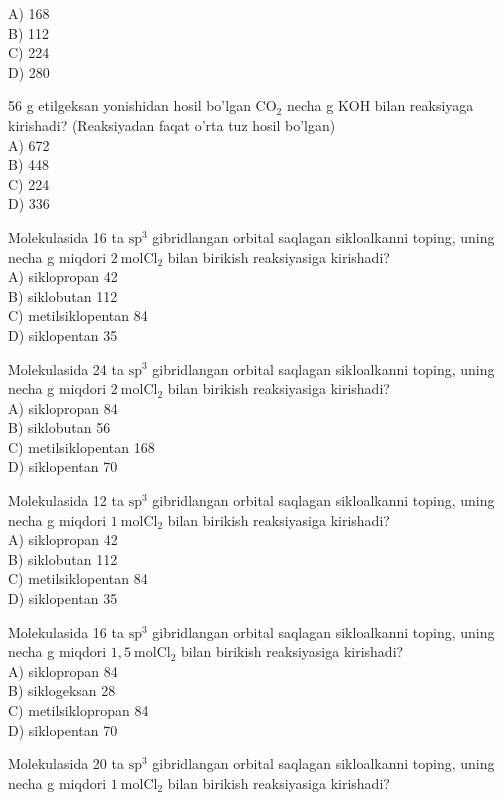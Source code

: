 A) 168\\
B) 112\\
C) 224\\
D) 280
  \item 56 g etilgeksan yonishidan hosil bo'lgan $\mathrm{CO}_{2}$ necha g KOH bilan reaksiyaga kirishadi? (Reaksiyadan faqat o'rta tuz hosil bo'lgan)\\
A) 672\\
B) 448\\
C) 224\\
D) 336
  \item Molekulasida 16 ta $\mathrm{sp}^{3}$ gibridlangan orbital saqlagan sikloalkanni toping, uning necha g miqdori $2 \mathrm{~mol} \mathrm{Cl}_{2}$ bilan birikish reaksiyasiga kirishadi?\\
A) siklopropan 42\\
B) siklobutan 112\\
C) metilsiklopentan 84\\
D) siklopentan 35
  \item Molekulasida 24 ta $\mathrm{sp}^{3}$ gibridlangan orbital saqlagan sikloalkanni toping, uning necha g miqdori $2 \mathrm{~mol} \mathrm{Cl}_{2}$ bilan birikish reaksiyasiga kirishadi?\\
A) siklopropan 84\\
B) siklobutan 56\\
C) metilsiklopentan 168\\
D) siklopentan 70
  \item Molekulasida 12 ta $\mathrm{sp}^{3}$ gibridlangan orbital saqlagan sikloalkanni toping, uning necha g miqdori $1 \mathrm{~mol} \mathrm{Cl}_{2}$ bilan birikish reaksiyasiga kirishadi?\\
A) siklopropan 42\\
B) siklobutan 112\\
C) metilsiklopentan 84\\
D) siklopentan 35
  \item Molekulasida 16 ta $\mathrm{sp}^{3}$ gibridlangan orbital saqlagan sikloalkanni toping, uning necha g miqdori $1,5 \mathrm{~mol} \mathrm{Cl}_{2}$ bilan birikish reaksiyasiga kirishadi?\\
A) siklopropan 84\\
B) siklogeksan 28\\
C) metilsiklopropan 84\\
D) siklopentan 70
  \item Molekulasida 20 ta $\mathrm{sp}^{3}$ gibridlangan orbital saqlagan sikloalkanni toping, uning necha g miqdori $1 \mathrm{~mol} \mathrm{Cl}_{2}$ bilan birikish reaksiyasiga kirishadi?\\
